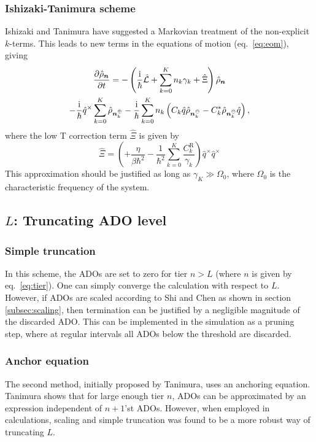 \subsubsection{Ishizaki-Tanimura scheme}
Ishizaki and Tanimura have suggested a Markovian treatment of the non-explicit $k$-terms.\supercite{Ishizaki2005,Ishizaki2006, Tanimura2006a} This leads to new terms in the equations of motion (eq.~\ref{eq:eom}), giving
\begin{multline}
	\frac{\partial \hat{\rho}_{\bm{n}} }{\partial t} =
	-\left(
		\frac{\mathrm{i}}{\hbar}\hat{\mathcal{L}}
		+\sum_{k=0}^{K}n_k \gamma_k
		+\hat{\Xi}
	\right)\hat{\rho}_{\bm{n}} \\
	-\frac{\mathrm{i}}{\hbar}\hat{q}^\times \sum_{k=0}^{K}\hat{\rho}_{\bm{n}_k^\oplus}
	-\frac{\mathrm{i}}{\hbar}\sum_{k=0}^{K}n_k\left(C_k\hat{q}\hat{\rho}_{\bm{n}_k^\ominus}-C_k^*\hat{\rho}_{\bm{n}_k^\ominus}\hat{q}\right),
	\label{eq:low_temp_correction}
\end{multline}
where the low T correction term $\hat{\Xi}$ is given by
\begin{equation}
	\hat{\Xi} = \left(+\frac{\eta}{\beta\hbar^2}
	-\frac{1}{\hbar^2}\sum_{k=0}^{K} \frac{C_k^\mathrm{R}}{\gamma_k}\right)\hat{q}^\times\hat{q}^\times
\end{equation}
This approximation should be justified as long as $\gamma_K \gg \Omega_0$, where $\Omega_0$ is the characteristic frequency of the system.\supercite{Ishizaki2005}


\subsection{$L$: Truncating ADO level}\label{subsec:L_truncation}
\subsubsection{Simple truncation}
In this scheme, the ADOs are set to zero for tier $n>L$ (where $n$ is given by eq.~\ref{eq:tier}). One can simply converge the calculation with respect to $L$. However, if ADOs are scaled according to Shi and Chen as shown in section \ref{subsec:scaling}, then termination can be justified by a negligible magnitude of the discarded ADO. This can be implemented in the simulation as a pruning step, where at regular intervals all ADOs below the threshold are discarded.
\subsubsection{Anchor equation}
The second method, initially proposed by Tanimura,\supercite{Tanimura1991a,Ishizaki2005} uses an anchoring equation. Tanimura shows that for large enough tier $n$, ADOs can be approximated by an expression independent of $n+1$'st ADOs. However, when employed in calculations, scaling and simple truncation was found to be a more robust way of truncating $L$.
\newpage
